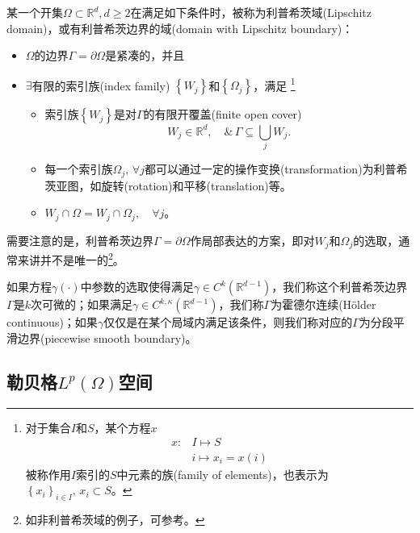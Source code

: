 \begin{definition}[利普希茨域]
  \label{definition:bvp-lipschitz-domain-def}
  某一个开集$\Omega \subset \mathbb{R}^d, d \ge 2$在满足如下条件时，被称为利普希茨域(Lipschitz domain)，或有利普希茨边界的域(domain with Lipschitz boundary)：
  \begin{itemize}
    \item $\Omega$的边界$\Gamma = \partial \Omega$是紧凑的，并且
    \item $\exists$有限的索引族(index family)  $\left\{W_j\right\}$和$\left\{ \Omega_j\right\}$，满足
    \footnote{对于集合$I$和$S$，某个方程$x$
    \begin{equation*}
    \begin{split}
      x:&I \mapsto S \\
      &i \mapsto x_i = x(i)
    \end{split}
  \end{equation*}被称作用$I$索引的$S$中元素的族(family of elements)\index{}，也表示为$\left\{ x_i \right\}_{i \in I},\, x_i \subset S$。
  }
  \begin{itemize}
    \item 索引族$\left\{ W_j \right\}$是对$\Gamma$的有限开覆盖(finite open cover)
    \begin{equation*}
      W_j \in \mathbb{R}^d, \quad \& \, \Gamma \subseteq \bigcup_j W_j.
    \end{equation*}
    \item 每一个索引族$\Omega_j, \, \forall j$都可以通过一定的操作变换(transformation)为利普希茨亚图，如旋转(rotation)和平移(translation)等。
    \item $W_j \cap \Omega = W_j \cap \Omega_j, \quad \forall j$。
  \end{itemize}
  \end{itemize}
\end{definition}

需要注意的是，利普希茨边界$\Gamma = \partial \Omega$作局部表达的方案，即对$W_j$和$\Omega_j$的选取，通常来讲并不是唯一的\footnote{如非利普希茨域的例子，可参考\cite{McLean:2000ta}。}。

如果方程$\gamma(\cdot)$中参数的选取使得满足$\gamma \in C^{k}(\mathbb{R}^{d-1})$，我们称这个利普希茨边界$\Gamma$是$k$次可微的；如果满足$\gamma \in C^{k, \kappa}(\mathbb{R}^{d-1})$，我们称$\Gamma$为霍德尔连续(Hölder continuous)；如果$\gamma$仅仅是在某个局域内满足该条件，则我们称对应的$\Gamma$为分段平滑边界(piecewise smooth boundary)。

\subsection{勒贝格\texorpdfstring{$L^p(\Omega)$}{(LP)}空间}

